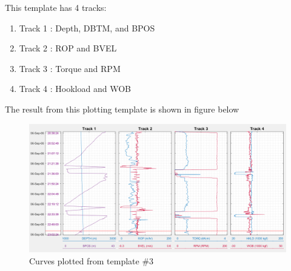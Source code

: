 \documentclass[12pt,a4paper,oneside]{report}
\begin{document}
\noindent This template has 4 tracks:
\begin{enumerate}
\setlength\itemsep{0.1em}
\item Track 1 : Depth, DBTM, and BPOS
\item Track 2 : ROP and BVEL
\item Track 3 : Torque and RPM
\item Track 4 : Hookload and WOB
\end{enumerate}

\noindent The result from this plotting template is shown in figure below
\begin{figure}[H]
\centering
\includegraphics[width=\textwidth]{fig/example3.PNG}
\caption{Curves plotted from template $\#3$}
\end{figure}
\end{document}
